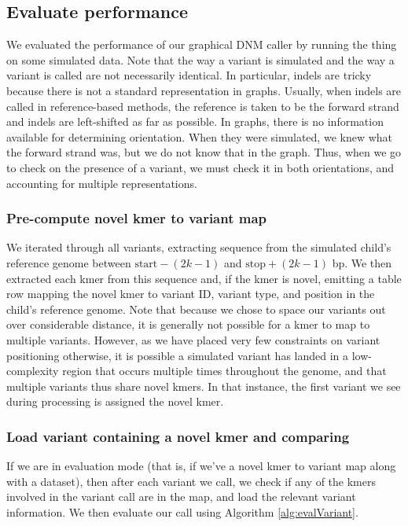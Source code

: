 \subsection{Evaluate performance}

We evaluated the performance of our graphical DNM caller by running the thing on some simulated data.  Note that the way a variant is simulated and the way a variant is called are not necessarily identical.  In particular, indels are tricky because there is not a standard representation in graphs.  Usually, when indels are called in reference-based methods, the reference is taken to be the forward strand and indels are left-shifted as far as possible.  In graphs, there is no information available for determining orientation.  When they were simulated, we knew what the forward strand was, but we do not know that in the graph.  Thus, when we go to check on the presence of a variant, we must check it in both orientations, and accounting for multiple representations.

\subsubsection{Pre-compute novel kmer to variant map}

We iterated through all variants, extracting sequence from the simulated child's reference genome between $\textrm{start} - (2k - 1)$ and $\textrm{stop} + (2k - 1)$ bp.  We then extracted each kmer from this sequence and, if the kmer is novel, emitting a table row mapping the novel kmer to variant ID, variant type, and position in the child's reference genome.  Note that because we chose to space our variants out over considerable distance, it is generally not possible for a kmer to map to multiple variants.  However, as we have placed very few constraints on variant positioning otherwise, it is possible a simulated variant has landed in a low-complexity region that occurs multiple times throughout the genome, and that multiple variants thus share novel kmers.  In that instance, the first variant we see during processing is assigned the novel kmer.

\subsubsection{Load variant containing a novel kmer and comparing}

If we are in evaluation mode (that is, if we've a novel kmer to variant map along with a dataset), then after each variant we call, we check if any of the kmers involved in the variant call are in the map, and load the relevant variant information.  We then evaluate our call using Algorithm \ref{alg:evalVariant}.

